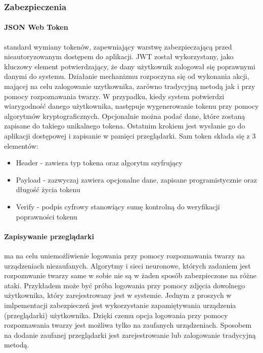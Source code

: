 
\subsubsection{Zabezpieczenia}
\paragraph{JSON Web Token} \cite{jwt} standard wymiany tokenów, zapewniający warstwę zabezpieczającą przed nieautoryzowanym dostępem do aplikacji. JWT został wykorzystany, jako kluczowy element potwierdzający, że dany użytkownik zalogował się poprawnymi danymi do systemu. Działanie mechanizmu rozpoczyna się od wykonania akcji, mającej na celu zalogowanie uzytkownika, zarówno tradycyjną metodą jak i przy pomocy rozpoznawania twarzy. W przypadku, kiedy system potwierdzi wiarygodność danego użytkownika, następuje wygenerowanie tokenu przy pomocy algorytmów kryptograficznych. Opcjonalnie można podać dane, które zostaną zapisane do takiego unikalnego tokena. Ostatnim krokiem jest wysłanie go do aplikacji dostępowej i zapisanie w pamięci przeglądarki. Sam token składa się z 3 elementów:
\begin{itemize}
  \item Header - zawiera typ tokena oraz algorytm szyfrujący
  \item Payload - zazwyczaj zawiera opcjonalne dane, zapisane programistycznie oraz długość życia tokenu
  \item Verify - podpis cyfrowy stanowiący sumę kontrolną do weryfikacji poprawności tokenu
\end{itemize}

\paragraph{Zapisywanie przeglądarki} ma na celu uniemożliwienie logowania przy pomocy rozpoznawania twarzy na urządzeniach niezaufanych. Algorytmy i sieci neuronowe, których zadaniem jest rozpoznwanie twarzy same w sobie nie są w żaden sposób zabezpieczone na różne ataki. Przykładem może być próba logowania przy pomocy zdjęcia dowolnego użytkownika, który zarejestrowany jest w systemie. Jednym z proszych w imlpementacji zabezpieczeń jest wykorzystanie zapamiętywania urządzenia (przeglądarki) użytkownika. Dzięki czemu opcja logowania przy pomocy rozpoznawania twarzy jest możliwa tylko na zaufanych urządzeniach. Sposobem na dodanie zaufanej przeglądarki jest zarejestrowanie lub zalogowanie tradycyjną metodą.


